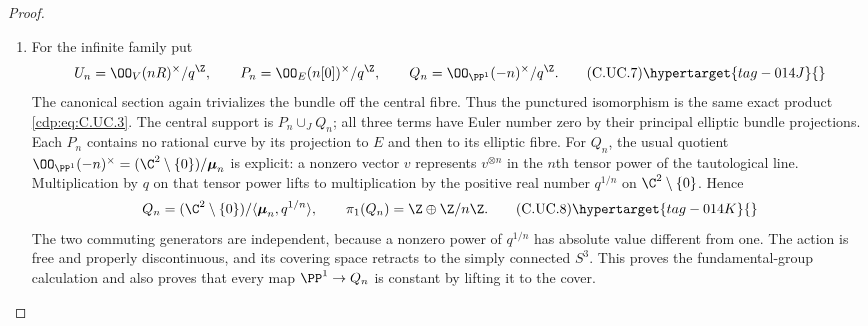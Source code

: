 \begin{proof}
\begin{enumerate}[label={$\langle1\rangle$\arabic*.},leftmargin=*]
\item For the infinite family put
\[
 U_n=\OO_V(nR)^\times/q^{\Z},\qquad
 P_n=\OO_E(n[0])^\times/q^{\Z},\qquad
 Q_n=\OO_{\PP^1}(-n)^\times/q^{\Z}.
\tag{C.UC.7}\hypertarget{tag-014J}{}\label{cdp:eq:C.UC.7}
\]
The canonical section again trivializes the
bundle off the central fibre. Thus the punctured
isomorphism is the same exact product \eqref{cdp:eq:C.UC.3}.
The central support is $P_n\cup_J Q_n$;
all three terms have Euler number zero by their
principal elliptic bundle projections. Each
$P_n$ contains no rational curve by its
projection to $E$ and then to its elliptic
fibre. For $Q_n$, the usual quotient
$\OO_{\PP^1}(-n)^\times
=(\C^2\setminus\{0\})/\boldsymbol\mu_n$
is explicit: a nonzero vector $v$ represents
$v^{\otimes n}$ in the $n$th tensor power of
the tautological line. Multiplication by $q$
on that tensor power lifts to multiplication
by the positive real number $q^{1/n}$ on
$\C^2\setminus\{0\}$. Hence
\[
 Q_n=(\C^2\setminus\{0\})/
       \langle\boldsymbol\mu_n,q^{1/n}\rangle,
 \qquad
 \pi_1(Q_n)=\Z\oplus\Z/n\Z.
\tag{C.UC.8}\hypertarget{tag-014K}{}\label{cdp:eq:C.UC.8}
\]
The two commuting generators are independent,
because a nonzero power of $q^{1/n}$ has
absolute value different from one. The action
is free and properly discontinuous, and its
covering space retracts to the simply connected
$S^3$. This proves the fundamental-group
calculation and also proves that every map
$\PP^1\to Q_n$ is constant by lifting it to
the cover.


\end{enumerate}
\end{proof}
